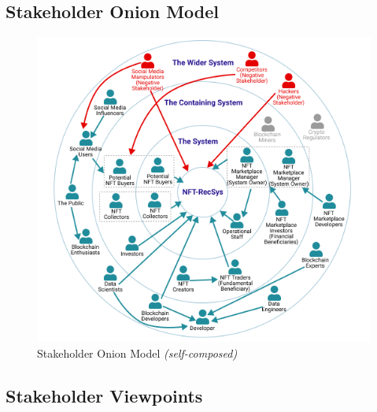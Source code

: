 \subsection{Stakeholder Onion Model}
\begin{figure}[h!]
\centering
\includegraphics[width=\textwidth]{images/SRS/stakeholder-onion-diagram.png}
\caption{Stakeholder Onion Model \textit{(self-composed)}}
\label{fig:stakeholder-onion}
\end{figure}

\subsection{Stakeholder Viewpoints}


